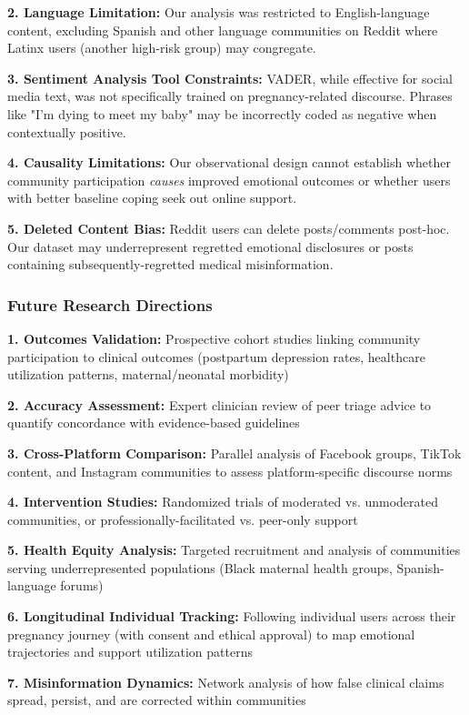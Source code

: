 \documentclass[12pt, a4paper]{article}
\begin{document}
\textbf{2. Language Limitation:} Our analysis was restricted to English-language content, excluding Spanish and other language communities on Reddit where Latinx users (another high-risk group) may congregate.

\textbf{3. Sentiment Analysis Tool Constraints:} VADER, while effective for social media text, was not specifically trained on pregnancy-related discourse. Phrases like "I'm dying to meet my baby" may be incorrectly coded as negative when contextually positive.

\textbf{4. Causality Limitations:} Our observational design cannot establish whether community participation \textit{causes} improved emotional outcomes or whether users with better baseline coping seek out online support.

\textbf{5. Deleted Content Bias:} Reddit users can delete posts/comments post-hoc. Our dataset may underrepresent regretted emotional disclosures or posts containing subsequently-regretted medical misinformation.

\subsubsection{Future Research Directions}
\textbf{1. Outcomes Validation:} Prospective cohort studies linking community participation to clinical outcomes (postpartum depression rates, healthcare utilization patterns, maternal/neonatal morbidity)

\textbf{2. Accuracy Assessment:} Expert clinician review of peer triage advice to quantify concordance with evidence-based guidelines

\textbf{3. Cross-Platform Comparison:} Parallel analysis of Facebook groups, TikTok content, and Instagram communities to assess platform-specific discourse norms

\textbf{4. Intervention Studies:} Randomized trials of moderated vs. unmoderated communities, or professionally-facilitated vs. peer-only support

\textbf{5. Health Equity Analysis:} Targeted recruitment and analysis of communities serving underrepresented populations (Black maternal health groups, Spanish-language forums)

\textbf{6. Longitudinal Individual Tracking:} Following individual users across their pregnancy journey (with consent and ethical approval) to map emotional trajectories and support utilization patterns

\textbf{7. Misinformation Dynamics:} Network analysis of how false clinical claims spread, persist, and are corrected within communities
\end{document}
